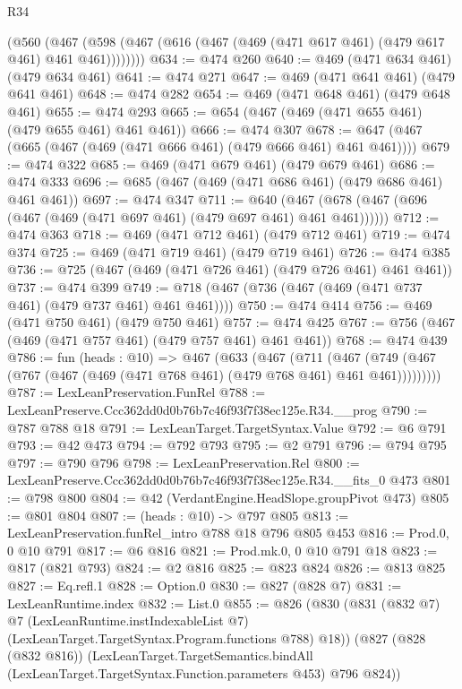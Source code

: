 \begin{lexlean}{R34}
\begin{coremodule}
      (@560 (@467 (@598 (@467 (@616 (@467 (@469 (@471 @617 @461) (@479 @617 @461) @461 @461))))))))
@634 := @474 @260
@640 := @469 (@471 @634 @461) (@479 @634 @461)
@641 := @474 @271
@647 := @469 (@471 @641 @461) (@479 @641 @461)
@648 := @474 @282
@654 := @469 (@471 @648 @461) (@479 @648 @461)
@655 := @474 @293
@665 := @654 (@467 (@469 (@471 @655 @461) (@479 @655 @461) @461 @461))
@666 := @474 @307
@678 := @647 (@467 (@665 (@467 (@469 (@471 @666 @461) (@479 @666 @461) @461 @461))))
@679 := @474 @322
@685 := @469 (@471 @679 @461) (@479 @679 @461)
@686 := @474 @333
@696 := @685 (@467 (@469 (@471 @686 @461) (@479 @686 @461) @461 @461))
@697 := @474 @347
@711 := @640 (@467 (@678 (@467 (@696 (@467 (@469 (@471 @697 @461) (@479 @697 @461) @461 @461))))))
@712 := @474 @363
@718 := @469 (@471 @712 @461) (@479 @712 @461)
@719 := @474 @374
@725 := @469 (@471 @719 @461) (@479 @719 @461)
@726 := @474 @385
@736 := @725 (@467 (@469 (@471 @726 @461) (@479 @726 @461) @461 @461))
@737 := @474 @399
@749 := @718 (@467 (@736 (@467 (@469 (@471 @737 @461) (@479 @737 @461) @461 @461))))
@750 := @474 @414
@756 := @469 (@471 @750 @461) (@479 @750 @461)
@757 := @474 @425
@767 := @756 (@467 (@469 (@471 @757 @461) (@479 @757 @461) @461 @461))
@768 := @474 @439
@786 := fun (heads : @10) =>
  @467
    (@633
      (@467
        (@711
          (@467 (@749 (@467 (@767 (@467 (@469 (@471 @768 @461) (@479 @768 @461) @461 @461)))))))))
@787 := LexLeanPreservation.FunRel
@788 := LexLeanPreserve.Ccc362dd0d0b76b7c46f93f7f38ec125e.R34.__prog
@790 := @787 @788 @18
@791 := LexLeanTarget.TargetSyntax.Value
@792 := @6 @791
@793 := @42 @473
@794 := @792 @793
@795 := @2 @791
@796 := @794 @795
@797 := @790 @796
@798 := LexLeanPreservation.Rel
@800 := LexLeanPreserve.Ccc362dd0d0b76b7c46f93f7f38ec125e.R34.__fits_0 @473
@801 := @798 @800
@804 := @42 (VerdantEngine.HeadSlope.groupPivot @473)
@805 := @801 @804
@807 := (heads : @10) -> @797 @805
@813 := LexLeanPreservation.funRel_intro @788 @18 @796 @805 @453
@816 := Prod.{0, 0} @10 @791
@817 := @6 @816
@821 := Prod.mk.{0, 0} @10 @791 @18
@823 := @817 (@821 @793)
@824 := @2 @816
@825 := @823 @824
@826 := @813 @825
@827 := Eq.refl.{1}
@828 := Option.{0}
@830 := @827 (@828 @7)
@831 := LexLeanRuntime.index
@832 := List.{0}
@855 := @826
    (@830
      (@831
        (@832 @7)
        @7
        (LexLeanRuntime.instIndexableList @7)
        (LexLeanTarget.TargetSyntax.Program.functions @788)
        @18))
    (@827
      (@828 (@832 @816))
      (LexLeanTarget.TargetSemantics.bindAll
        (LexLeanTarget.TargetSyntax.Function.parameters @453)
        @796
        @824))

\end{coremodule}
\end{lexlean}
